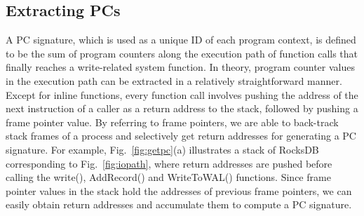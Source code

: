 \subsection{Extracting PCs}
A PC signature, which is used as a unique ID of each program context,
is defined
to be the sum of program counters along the execution path of function calls
that finally reaches a write-related system function.  In theory, program
counter values in the execution path can be extracted in a relatively
straightforward manner.  Except for inline functions, every function call
involves pushing the address of the next instruction of a caller as a return
address to the stack, followed by pushing a frame pointer value.  By referring
to frame pointers, we are able to back-track stack frames of a process and
selectively get return addresses for generating a PC signature.
For example, Fig.~\ref{fig:getpc}(a) illustrates a stack of RocksDB corresponding
to Fig.~\ref{fig:iopath}, where return addresses are pushed before calling
the \textsf{\small  write()}, \textsf{\small AddRecord()} and \textsf{\small
WriteToWAL()} functions.  Since frame pointer values in the stack hold the
addresses of previous frame pointers, we can easily obtain return addresses and
accumulate them to compute a PC signature.  


